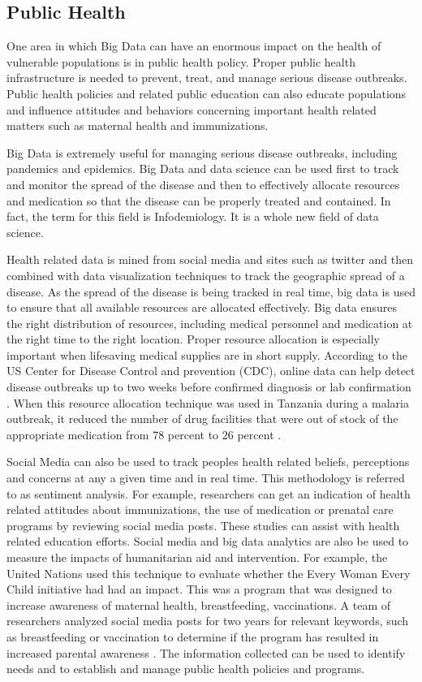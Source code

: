 \documentclass[sigconf]{acmart}
\begin{document}
\subsection{Public Health}
One area in which Big Data can have an enormous impact on the health of vulnerable populations is in public health policy. Proper public health infrastructure is needed to prevent, treat, and manage serious disease outbreaks. Public health policies and related public education can also educate populations and influence attitudes and behaviors concerning important health related matters such as maternal health and immunizations. 

Big Data is extremely useful for managing serious disease outbreaks, including pandemics and epidemics. Big Data and data science can be used first to track and monitor the spread of the disease and then to effectively allocate resources and medication so that the disease can be properly treated and contained. In fact, the term for this field is Infodemiology. It is a whole new field of data science.

Health related data is mined from social media and sites such as twitter and then combined with data visualization techniques to track the geographic spread of a disease. As the spread of the disease is being tracked in real time, big data is used to ensure that all available resources are allocated effectively. Big data ensures the right distribution of resources, including medical personnel and medication at the right time to the right location. Proper resource allocation is especially important when lifesaving medical supplies are in short supply. According to the US Center for Disease Control and prevention (CDC), online data can help detect disease outbreaks up to two weeks before confirmed diagnosis or lab confirmation \cite{www-google-GloPls}.  When this resource allocation technique was used in Tanzania during a malaria outbreak, it reduced the number of drug facilities that were out of stock of the appropriate medication from 78 percent to 26 percent \cite{DevEcon}.

Social Media can also be used to track peoples health related beliefs, perceptions and concerns at any a given time and in real time. This methodology is referred to as sentiment analysis. For example, researchers can get an indication of health related attitudes about immunizations, the use of medication or prenatal care programs by reviewing social media posts.  These studies can assist with health related education efforts. Social media and big data analytics are also be used to measure the impacts of humanitarian aid and intervention. For example, the United Nations used this technique to evaluate whether the Every Woman Every Child initiative had had an impact. This was a program that was designed to increase awareness of maternal health, breastfeeding, vaccinations. A team of researchers analyzed social media posts for two years for relevant keywords, such as breastfeeding or vaccination to determine if the program has resulted in increased parental awareness \cite{DevEcon}. The information collected can be used to identify needs and to establish and manage public health policies and programs.
\end{document}
